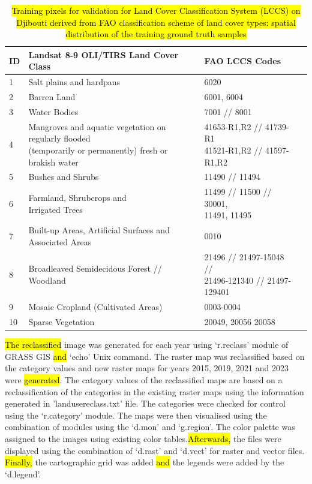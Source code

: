 \documentclass[jimaging,article,submit,pdftex,moreauthors]{Definitions/mdpi}
\begin{document}
\begin{table}[H]
\caption{\hl{Training pixels for validation for Land Cover Classification System (LCCS) on Djibouti derived from FAO classification scheme of land cover types: spatial distribution of the training ground truth samples}}\label{tabFAO}%
\small
\begin{tabularx}{\textwidth}{llll}
\toprule
ID & Landsat 8-9 OLI/TIRS Land Cover Class & FAO LCCS Codes  \\
\midrule

       1 & Salt plains and hardpans & 6020 \\ \midrule
        2 & Barren Land & 6001, 6004  \\ \midrule
        3 & Water Bodies & 7001 // 8001  \\ \midrule
        4 & \makecell{Mangroves and aquatic vegetation on regularly flooded \\(temporarily or permanently) fresh or brakish water} & \makecell{41653-R1,R2 // 41739-R1 \\ 41521-R1,R2 // 41597-R1,R2}  \\ \midrule
        5 & Bushes and Shrubs & 11490 // 11494 \\ \midrule
        6 & \makecell{Farmland, Shrubcrops and \\Irrigated Trees} & \makecell{11499 // 11500 // 30001, \\11491, 11495}  \\ \midrule
        7 & Built-up Areas, Artificial Surfaces and Associated Areas & 0010  \\ \midrule
        8 &Broadleaved Semidecidous Forest // Woodland & \makecell{21496 // 21497-15048 // \\21496-121340 // 21497-129401} \\  \midrule
        9 & Mosaic Cropland (Cultivated Areas) & 0003-0004 \\ \midrule
        10 & Sparse Vegetation & 20049, 20056 20058  \\
\bottomrule
\end{tabularx}
\end{table}

\hl{The reclassified }image was generated for each year using ‘r.reclass’ module of GRASS GIS \hl{and} ‘echo’ Unix command.\hl{ }The raster map was reclassified based on the category values and new raster maps for years 2015, 2019, 2021 and 2023 were \hl{generated}. The category values of the reclassified maps are based on a reclassification of the categories in the existing raster maps using the information generated in 'landusereclass.txt' file. The categories were checked for control using the ‘r.category’ module. The maps were then visualised using the combination of modules using the ‘d.mon’ and ‘g.region’.  The color palette was assigned to the images using existing color tables.\hl{Afterwards, }the files were displayed using the combination of ‘d.rast’ and ‘d.vect’ for raster and vector files. \hl{Finally, }the cartographic grid was added \hl{and} the legends were added by the ‘d.legend’.
\end{document}
